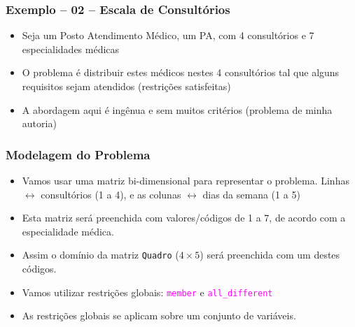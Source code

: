 \documentclass{beamer}
\begin{document}

\begin{frame}[fragile] 

\frametitle{Exemplo -- 02 -- Escala de Consultórios}



\begin{itemize}
\item Seja um Posto Atendimento Médico, um PA, com 4 consultórios e 7 especialidades  médicas


\item O problema é distribuir estes médicos nestes 4 consultórios
tal que alguns requisitos sejam atendidos (restrições  satisfeitas)

\item A abordagem aqui é ingênua e sem muitos critérios (problema de minha autoria)
\end{itemize}

\end{frame}

\begin{frame}[fragile] 

\frametitle{Modelagem do Problema}

\begin{itemize}
  \item  Vamos usar uma matriz bi-dimensional para 
  representar o problema. Linhas $\leftrightarrow$ consultórios (1 a 4), e 
  as colunas $\leftrightarrow$ dias da semana (1 a 5)

  
  \item Esta matriz será preenchida com valores/códigos de 1 a 7, de acordo com a especialidade médica.
  
  
  \item Assim o domínio da matriz \texttt{Quadro} ($4 \times 5$) será   preenchida com um destes códigos.
   
  
  \item Vamos utilizar restrições globais: \textcolor{magenta}{\texttt{member}} e 
  \textcolor{magenta}{\texttt{all\_different}}

   \item As restrições globais se aplicam sobre um conjunto de variáveis.

\end{itemize}

\end{frame}

\end{document}
